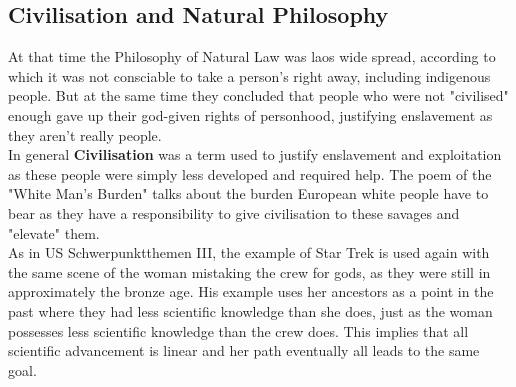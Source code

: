 \documentclass{article}
\begin{document}
	\subsection{Civilisation and Natural Philosophy}
	At that time the Philosophy of Natural Law was laos wide spread, according to which it was not consciable to take a person's right away, including indigenous people. But at the same time they concluded that people who were not "civilised" enough gave up their god-given rights of personhood, justifying enslavement as they aren't really people. \\
	In general \textbf{Civilisation} was a term used to justify enslavement and exploitation as these people were simply less developed and required help. The poem of the "White Man's Burden" talks about the burden European white people have to bear as they have a responsibility to give civilisation to these savages and "elevate" them. \\
	As in US Schwerpunktthemen III, the example of Star Trek is used again with the same scene of the woman mistaking the crew for gods, as they were still in approximately the bronze age. His example uses her ancestors as a point in the past where they had less scientific knowledge than she does, just as the woman possesses less scientific knowledge than the crew does. This implies that all scientific advancement is linear and her path eventually all leads to the same goal. \\
\end{document}
